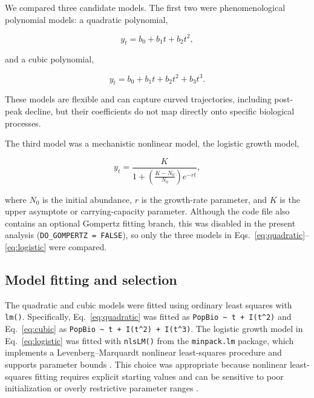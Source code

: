 \documentclass[11pt]{article}
\begin{document}
We compared three candidate models. The first two were phenomenological polynomial models: a quadratic polynomial,

\begin{equation}
y_t = b_0 + b_1 t + b_2 t^2,
\label{eq:quadratic}
\end{equation}

and a cubic polynomial,

\begin{equation}
y_t = b_0 + b_1 t + b_2 t^2 + b_3 t^3.
\label{eq:cubic}
\end{equation}

These models are flexible and can capture curved trajectories, including post-peak decline, but their coefficients do not map directly onto specific biological processes.

The third model was a mechanistic nonlinear model, the logistic growth model,

\begin{equation}
y_t = \frac{K}{1 + \left(\frac{K - N_0}{N_0}\right)e^{-rt}},
\label{eq:logistic}
\end{equation}

where $N_0$ is the initial abundance, $r$ is the growth-rate parameter, and $K$ is the upper asymptote or carrying-capacity parameter. Although the code file also contains an optional Gompertz fitting branch, this was disabled in the present analysis (\texttt{DO\_GOMPERTZ = FALSE}), so only the three models in Eqs.~\ref{eq:quadratic}--\ref{eq:logistic} were compared.

\subsection{Model fitting and selection}

The quadratic and cubic models were fitted using ordinary least squares with \texttt{lm()}. Specifically, Eq.~\ref{eq:quadratic} was fitted as \texttt{PopBio \textasciitilde{} t + I(t\textasciicircum 2)} and Eq.~\ref{eq:cubic} as \texttt{PopBio \textasciitilde{} t + I(t\textasciicircum 2) + I(t\textasciicircum 3)}. The logistic growth model in Eq.~\ref{eq:logistic} was fitted with \texttt{nlsLM()} from the \texttt{minpack.lm} package, which implements a Levenberg--Marquardt nonlinear least-squares procedure and supports parameter bounds \citep{Elzhov2023,More1978}. This choice was appropriate because nonlinear least-squares fitting requires explicit starting values and can be sensitive to poor initialization or overly restrictive parameter ranges \citep{Baty2015}.
\end{document}
